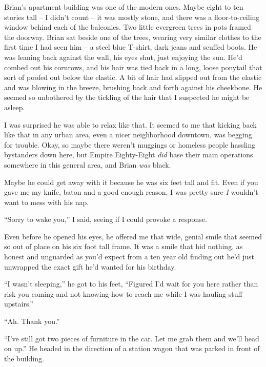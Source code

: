 Brian's apartment building was one of the modern ones.  Maybe eight to ten stories tall – I didn't count – it was mostly stone, and there was a floor-to-ceiling window behind each of the balconies.  Two little evergreen trees in pots framed the doorway.  Brian sat beside one of the trees, wearing very similar clothes to the first time I had seen him – a steel blue T-shirt, dark jeans and scuffed boots.  He was leaning back against the wall, his eyes shut, just enjoying the sun.  He'd combed out his cornrows, and his hair was tied back in a long, loose ponytail that sort of poofed out below the elastic.  A bit of hair had slipped out from the elastic and was blowing in the breeze, brushing back and forth against his cheekbone.  He seemed so unbothered by the tickling of the hair that I suspected he might be asleep.



I was surprised he was able to relax like that.  It seemed to me that kicking back like that in any urban area, even a nicer neighborhood downtown, was begging for trouble.  Okay, so maybe there weren't muggings or homeless people hassling bystanders down here, but Empire Eighty-Eight \emph{did} base their main operations somewhere in this general area, and Brian \emph{was} black.



Maybe he could get away with it because he was six feet tall and fit.  Even if you gave me my knife, baton and a good enough reason, I was pretty sure \emph{I} wouldn't want to mess with his nap.



``Sorry to wake you,'' I said, seeing if I could provoke a response.



Even before he opened his eyes, he offered me that wide, genial smile that seemed so out of place on his six foot tall frame.  It was a smile that hid nothing, as honest and unguarded as you'd expect from a ten year old finding out he'd just unwrapped the exact gift he'd wanted for his birthday.



``I wasn't sleeping,'' he got to his feet, ``Figured I'd wait for you here rather than risk you coming and not knowing how to reach me while I was hauling stuff upstairs.''



``Ah.  Thank you.''



``I've still got two pieces of furniture in the car.  Let me grab them and we'll head on up.''  He headed in the direction of a station wagon that was parked in front of the building.



